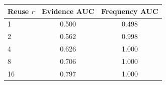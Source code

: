 \begin{tabular}{lcc}
\toprule
Reuse $r$ & Evidence AUC & Frequency AUC \\
\midrule
1 & 0.500 & 0.498 \\
2 & 0.562 & 0.998 \\
4 & 0.626 & 1.000 \\
8 & 0.706 & 1.000 \\
16 & 0.797 & 1.000 \\
\bottomrule
\end{tabular}
